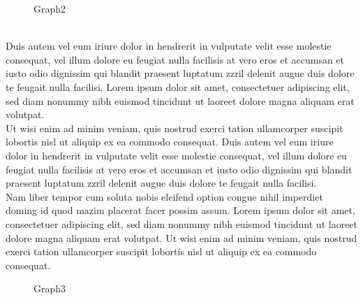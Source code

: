 \documentclass{scrartcl}
\begin{document}
\begin{wrapfigure}{r}{0.47\textwidth}
     \centering
     \lineChart
     \caption{Graph2}
\end{wrapfigure} ~\\
Duis autem vel eum iriure dolor in hendrerit in vulputate velit esse molestie consequat, vel illum dolore eu feugiat nulla facilisis at vero eros et accumsan et iusto odio dignissim qui blandit praesent luptatum zzril delenit augue duis dolore te feugait nulla facilisi. Lorem ipsum dolor sit amet, consectetuer adipiscing elit, sed diam nonummy nibh euismod tincidunt ut laoreet dolore magna aliquam erat volutpat.   \\[8pt]
Ut wisi enim ad minim veniam, quis nostrud exerci tation ullamcorper suscipit lobortis nisl ut aliquip ex ea commodo consequat. Duis autem vel eum iriure dolor in hendrerit in vulputate velit esse molestie consequat, vel illum dolore eu feugiat nulla facilisis at vero eros et accumsan et iusto odio dignissim qui blandit praesent luptatum zzril delenit augue duis dolore te feugait nulla facilisi.   \\[8pt]
Nam liber tempor cum soluta nobis eleifend option congue nihil imperdiet doming id quod mazim placerat facer possim assum. Lorem ipsum dolor sit amet, consectetuer adipiscing elit, sed diam nonummy nibh euismod tincidunt ut laoreet dolore magna aliquam erat volutpat. Ut wisi enim ad minim veniam, quis nostrud exerci tation ullamcorper suscipit lobortis nisl ut aliquip ex ea commodo consequat.  \\[8pt]
\begin{figure}[h]
    \centering
    \lineChart
    \caption{Graph3}
\end{figure}
\end{document}

